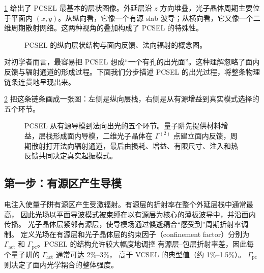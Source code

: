\cref{fig:pcsel-layer} 给出了 PCSEL 最基本的层状图像。外延层沿 $z$ 方向堆叠，光子晶体周期主要位于平面内 $(x,y)$。从纵向看，它像一个有源 slab 波导；从横向看，它又像一个二维周期散射网络。这两种视角的叠加构成了 PCSEL 的特殊性。

\begin{figure}[htbp]
  \centering
  \caption{PCSEL 的纵向层状结构与面内反馈、法向辐射的概念图。}
  \label{fig:pcsel-layer}
\end{figure}

对初学者而言，最容易把 PCSEL 想成“一个有孔的出光面”。这种理解忽略了面内反馈与辐射通道的形成过程。下面我们分步描述 PCSEL 的出光过程，将整条物理链条连贯地呈现出来\cite{noda2023tutorial}。

\cref{fig:ch01_pcsel_light_output_chain} 把这条链条画成一张图：左侧是纵向层栈，右侧是从有源增益到真实模式选择的五个环节。

\begin{figure}[htbp]
  \centering
  
  \caption{PCSEL 从有源导模到法向出光的五个环节。量子阱先提供材料增益，层栈形成面内导模，二维光子晶体在 $\Gamma^{(2)}$ 点建立面内反馈，周期散射打开法向辐射通道，最后由损耗、增益、有限尺寸、注入和热反馈共同决定真实起振模式。}
  \label{fig:ch01_pcsel_light_output_chain}
\end{figure}

\subsection{第一步：有源区产生导模}
电注入使量子阱有源区产生受激辐射。有源层的折射率在整个外延层栈中通常最高，
因此光场以平面导波模式被束缚在以有源层为核心的薄板波导中，并沿面内传播。
光子晶体层紧邻有源层，使导模场通过倏逝耦合“感受到”周期折射率调制。
定义光场在有源层和光子晶体层的约束因子（confinement factor）分别为
$\Gamma_{\mathrm{act}}$ 和 $\Gamma_{\mathrm{pc}}$。PCSEL 的结构允许较大幅度地调控
有源层--包层折射率差，因此每个量子阱的 $\Gamma_{\mathrm{act}}$ 通常可达 2\%--3\%，
高于 VCSEL 的典型值（约 1\%--1.5\%）\cite{noda2023tutorial}。
$\Gamma_{\mathrm{pc}}$ 则决定了面内光学耦合的整体强度。


